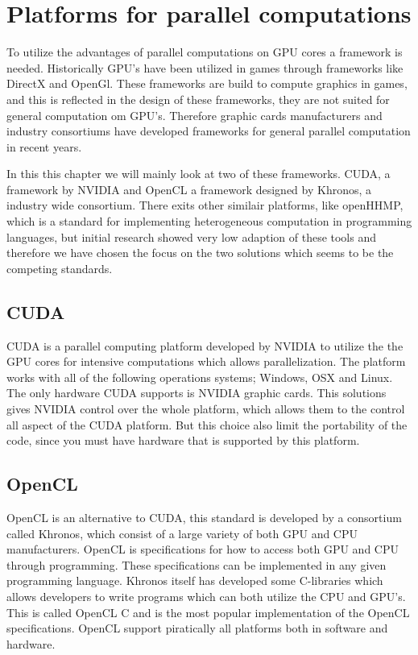 \section{Platforms for parallel computations}
To utilize the advantages of parallel computations on GPU cores a framework is needed.
Historically GPU's have been utilized in games through frameworks like DirectX and OpenGl.
These frameworks are build to compute graphics in games, and this is reflected in the design of these frameworks, they are not suited for general computation om GPU's.
Therefore graphic cards manufacturers and industry consortiums have developed frameworks for general parallel computation in recent years.

In this this chapter we will mainly look at two of these frameworks.
CUDA, a framework by NVIDIA and OpenCL a framework designed by Khronos, a industry wide consortium.\citep{CUDA, OpenCL}
There exits other similair platforms, like openHHMP, which is a standard for implementing heterogeneous computation in programming languages, but initial research showed very low adaption of these tools and therefore we have chosen the focus on the two solutions which seems to be the competing standards. 

\subsection{CUDA}\label{sec:opencl}
CUDA is a parallel computing platform developed by NVIDIA to utilize the the GPU cores for intensive computations which allows parallelization.
The platform works with all of the following operations systems; Windows, OSX and Linux.
The only hardware CUDA supports is NVIDIA graphic cards. 
This solutions gives NVIDIA control over the whole platform, which allows them to the control all aspect of the CUDA platform.
But this choice also limit the  portability of the code, since you must have hardware that is supported by this platform. \citep{CUDAfaq}

\subsection{OpenCL}
OpenCL is an alternative to CUDA, this standard is developed by a consortium called Khronos, which consist of a large variety of both GPU and CPU manufacturers.
OpenCL is specifications for how to access both GPU and CPU through programming.
These specifications can be implemented in any given programming language.
Khronos itself has developed some C-libraries which allows developers to write programs which can both utilize the CPU and GPU's.
This is called OpenCL C and is the most popular implementation of the OpenCL specifications.
OpenCL support piratically all platforms both in software and hardware. 

